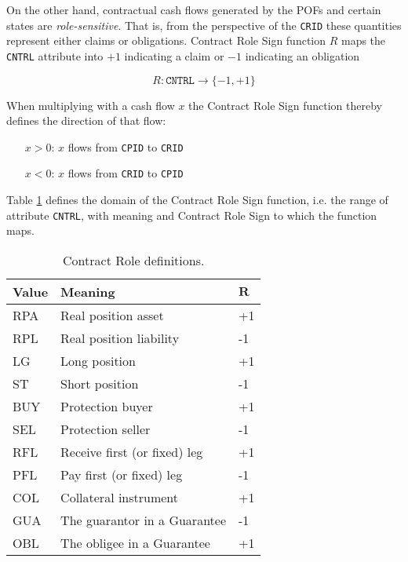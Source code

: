 \documentclass[9pt,oneside]{amsart}
\newcommand{\attr}[1]{\texttt{#1}}
\begin{document}
\begin{multicols}{2}
On the other hand, contractual cash flows generated by the POFs and certain states are \textit{role-sensitive}. That is, from the perspective of the \attr{CRID} these quantities represent either claims or obligations. Contract Role Sign function $R$ maps the \attr{CNTRL} attribute into $+1$ indicating a claim or $-1$ indicating an obligation

\[
	R : \attr{CNTRL} \rightarrow \{-1, +1 \}
\]

When multiplying with a cash flow $x$ the Contract Role Sign function thereby defines the direction of that flow:

\begin{itemize}
	\item[$x>0$:] $x$ flows from \attr{CPID} to \attr{CRID}

	\item[$x<0$:] $x$ flows from \attr{CRID} to \attr{CPID}
\end{itemize}

Table \ref{tbl:cntrl} defines the domain of the Contract Role Sign function, i.e. the range of attribute \attr{CNTRL}, with meaning and Contract Role Sign to which the function maps.


\begin{table}[H]
	\centering
	\begin{tabular}{| p{0.5in}p{1.5in}p{0.2in} |}
	\hline
	\textbf{Value} & \textbf{Meaning} & $\textbf{R}$ \\
	\hline
	RPA & Real position asset & +1 \\
	\hline
	RPL & Real position liability & -1 \\
	\hline
	LG & Long position & +1 \\
	\hline
	ST & Short position & -1 \\
	\hline
	BUY & Protection buyer & +1 \\
	\hline
	SEL & Protection seller & -1 \\
	\hline
	RFL & Receive first (or fixed) leg & +1 \\
	\hline
	PFL & Pay first (or fixed) leg & -1 \\
	\hline
	COL & Collateral instrument & +1 \\
	\hline
	GUA & The guarantor in a Guarantee & -1 \\
	\hline
	OBL & The obligee in a Guarantee & +1 \\
	\hline
	\end{tabular}
	\caption{Contract Role definitions.}
	\label{tbl:cntrl}
\end{table}



\end{multicols}
\end{document}
